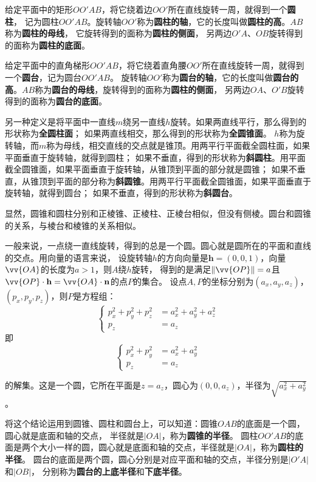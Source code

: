 \documentclass[12pt,UTF8]{ctexbook}
\begin{document}
给定平面中的矩形$OO'AB$，将它绕着边$OO'$所在直线旋转一周，就得到一个\textbf{圆柱}，
记为圆柱$OO'AB$。旋转轴$OO'$称为\textbf{圆柱的轴}，它的长度叫做\textbf{圆柱的高}。$AB$称为\textbf{圆柱的母线}，
它旋转得到的面称为\textbf{圆柱的侧面}，
另两边$O'A$、$OB$旋转得到的面称为\textbf{圆柱的底面}。

给定平面中的直角梯形$OO'AB$，将它绕着直角腰$OO'$所在直线旋转一周，就得到一个\textbf{圆台}，记为圆台$OO'AB$。
旋转轴$OO'$称为\textbf{圆台的轴}，它的长度叫做\textbf{圆台的高}。$AB$称为\textbf{圆台的母线}，旋转得到的面称为\textbf{圆柱的侧面}，
另两边$OA$、$O'B$旋转得到的面称为\textbf{圆台的底面}。

另一种定义是将平面中一直线$m$绕另一直线$h$旋转。如果两直线平行，那么得到的形状称为\textbf{全圆柱面}；
如果两直线相交，那么得到的形状称为\textbf{全圆锥面}。
$h$称为旋转轴，而$m$称为母线，相交直线的交点就是锥顶。用两平行平面截全圆柱面，如果平面垂直于旋转轴，就得到圆柱；
如果不垂直，得到的形状称为\textbf{斜圆柱}。用平面截全圆锥面，如果平面垂直于旋转轴，从锥顶到平面的部分就是圆锥；
如果不垂直，从锥顶到平面的部分称为\textbf{斜圆锥}。用两平行平面截全圆锥面，如果平面垂直于旋转轴，就得到圆台；
如果不垂直，得到的形状称为\textbf{斜圆台}。

显然，圆锥和圆柱分别和正棱锥、正棱柱、正棱台相似，但没有侧棱。圆台和圆锥的关系，与棱台和棱锥的关系相似。

一般来说，一点绕一直线旋转，得到的总是一个圆。圆心就是圆所在的平面和直线的交点。用向量的语言来说，
设旋转轴$h$的方向向量是$\mathbf{h} = (0,0,1)$，向量$\vv{OA}$的长度为$a>1$，则$A$绕$h$旋转，
得到的是满足$\|\vv{OP}\| = a$且$\vv{OP}\cdot\mathbf{h}=\vv{OA}\cdot\mathbf{n}$的点$P$的集合。
设点$A,P$的坐标分别为$(a_x,a_y,a_z)$，$(p_x,p_y,p_z)$，则$P$是方程组：
$$
\left\{
\begin{array}{rl}
    p_x^2+p_y^2+p_z^2 &= a_x^2+a_y^2+a_z^2 \\
    p_z &= a_z
\end{array}
\right.
$$
即
$$
\left\{
\begin{array}{rl}
    p_x^2+p_y^2 &= a_x^2+a_y^2 \\
    p_z &= a_z
\end{array}
\right.
$$

的解集。这是一个圆，它所在平面是$z=a_z$，圆心为$(0,0,a_z)$，半径为$\sqrt{a_x^2+a_y^2}$。

将这个结论运用到圆锥、圆柱和圆台上，可以知道：圆锥$OAB$的底面是一个圆，圆心就是底面和轴的交点，
半径就是$|OA|$，称为\textbf{圆锥的半径}。
圆柱$OO'AB$的底面是两个大小一样的圆，圆心就是底面和轴的交点，半径就是$|OA|$，称为\textbf{圆柱的半径}。
圆台的底面是两个圆，圆心分别是对应平面和轴的交点，半径分别是$|O'A|$和$|OB|$，
分别称为\textbf{圆台的上底半径}和\textbf{下底半径}。
\end{document}
